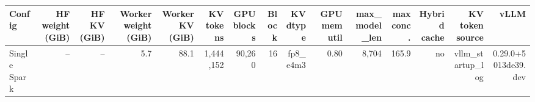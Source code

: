 \begin{tabular}{l r r r r r r r r r r r r r r }
\toprule
Config & HF weight (GiB) & HF KV (GiB) & Worker weight (GiB) & Worker KV (GiB) & KV tokens & GPU blocks & Block & KV dtype & GPU mem util & max\_model\_len & max conc. & Hybrid cache & KV token source & vLLM \\
\midrule
Single Spark & -- & -- & 5.7 & 88.1 & 1,444,152 & 90,260 & 16 & fp8\_e4m3 & 0.80 & 8,704 & 165.9 & no & vllm\_startup\_log & 0.29.0+5013de39.dev \\
\bottomrule
\end{tabular}
